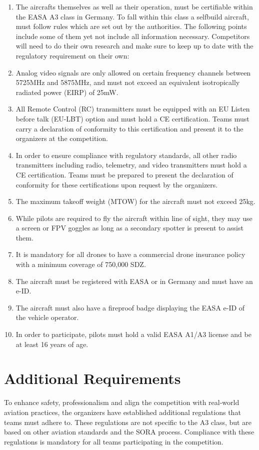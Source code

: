 \documentclass{article}
\begin{document}
\begin{enumerate}
  \item The aircrafts themselves as well as their operation, must be certifiable within the EASA A3 class in Germany. To fall within this class a selfbuild aircraft, must follow rules which are set out by the authorities. 
  The following points include some of them yet not include all information necessary. Competitors will need to do their own research and make sure to keep up to date with the regulatory requirement on their own:
  \item Analog video signals are only allowed on certain frequency channels between 5725MHz and 5875MHz, and must not exceed an equivalent isotropically radiated power (EIRP) of 25mW.
  \item All Remote Control (RC) transmitters must be equipped with an EU Listen before talk (EU-LBT) option and must hold a CE certification. Teams must carry a declaration of conformity to this certification and present it to the organizers at the competition.
  \item In order to ensure compliance with regulatory standards, all other radio transmitters including radio, telemetry, and video transmitters must hold a CE certification. Teams must be prepared to present the declaration of conformity for these certifications upon request by the organizers.
  \item The maximum takeoff weight (MTOW) for the aircraft must not exceed 25kg.
  \item While pilots are required to fly the aircraft within line of sight, they may use a screen or FPV goggles as long as a secondary spotter is present to assist them.
  \item It is mandatory for all drones to have a commercial drone insurance policy with a minimum coverage of 750,000 SDZ.
  \item The aircraft must be registered with EASA or in Germany and must have an e-ID.
  \item The aircraft must also have a fireproof badge displaying the EASA e-ID of the vehicle operator.
  \item In order to participate, pilots must hold a valid EASA A1/A3 license and be at least 16 years of age.
\end{enumerate}

\section{Additional Requirements}
To enhance safety, professionalism and align the competition with real-world aviation practices, the organizers have established additional regulations that teams must adhere to. These regulations are not specific to the A3 class, but are based on other aviation standards and the SORA process. Compliance with these regulations is mandatory for all teams participating in the competition.
\end{document}
